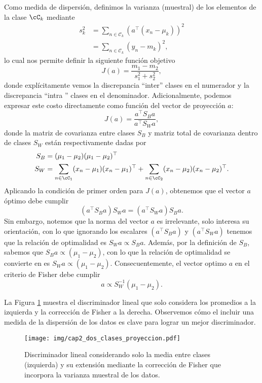 Como medida de dispersión, definimos la varianza (muestral) de los elementos de la clase $\cC_k$ mediante
\begin{align}
	s_k^2 &= \sum_{n\in \mathcal{C}_k}(a^\top(x_n-\mu_k))^2\\
	&= \sum_{n\in \mathcal{C}_k}(y_n-m_k)^2,
\end{align}
lo cual nos permite definir la siguiente función objetivo
\begin{equation}
J(a) = \frac{m_1-m_2}{s_1^2+s_2 ^2},
\end{equation}
donde explícitamente vemos la discrepancia ``inter'' clases en el numerador y la discrepancia  ``intra '' clases en el denominador. Adicionalmente, podemos expresar este costo directamente como función del vector de proyección $a$:
\begin{equation}
	J(a) = \frac{a^\top S_B a}{a^\top S_Wa},
\end{equation}
donde la matriz de covarianza entre clases $S_B$ y matriz total de covarianza dentro de clases $S_W$ están respectivamente dadas por
\begin{align}
	S_B &= (\mu_1-\mu_2)(\mu_1-\mu_2)^\top\\
	S_W &= \sum_{n\in \cC_1}(x_n-\mu_1)(x_n-\mu_1)^\top +
	\sum_{n\in \cC_2}(x_n-\mu_2)(x_n-\mu_2)^\top. 
\end{align}
Aplicando la condición de primer orden para $J(a)$, obtenemos que el vector $a$ óptimo debe cumplir
\begin{equation}
	(a^\top S_B a)S_W a = (a^\top S_W a)S_B a.	
\end{equation}
Sin embargo, notemos que la norma del vector  $a$ es irrelevante, solo interesa su orientación, con lo que  ignorando los escalares $(a^\top S_B a)$ y $(a^\top S_W a)$ tenemos que la relación de optimalidad es $S_W a \propto S_B a$. Además, por la definición de $S_B$, sabemos que $S_B a\propto(\mu_1-\mu_2)$, con lo que la relación de optimalidad se convierte en es $S_W a \propto (\mu_1-\mu_2)$. Consecuentemente, el vector optimo $a$ en el  criterio de Fisher debe cumplir
\begin{equation}
	a \propto S_W^{-1}(\mu_1-\mu_2).
\end{equation}

La Figura \ref{fig:ej_fda} muestra el  discriminador lineal que solo considera los promedios a la  izquierda y la corrección de Fisher a la derecha. Observemos cómo el incluir una medida de la dispersión de los datos es clave para lograr un mejor discriminador.

\begin{figure}[H]
	\centering
	\texttt{[image: img/cap2\_dos\_clases\_proyeccion.pdf]}
	\caption{Discriminador lineal considerando solo la media entre clases (izquierda) y  su extensión mediante la corrección de Fisher que incorpora la varianza muestral de los datos.}
	\label{fig:ej_fda}
\end{figure}


